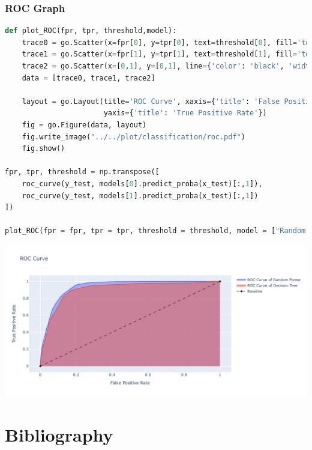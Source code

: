 \documentclass[11pt,a4paper]{article}
\begin{document}
    \subsubsection{ROC Graph}
\begin{lstlisting}[language = Python]
def plot_ROC(fpr, tpr, threshold,model):
    trace0 = go.Scatter(x=fpr[0], y=tpr[0], text=threshold[0], fill='tozeroy', name='ROC Curve of {} '.format(model[0]))
    trace1 = go.Scatter(x=fpr[1], y=tpr[1], text=threshold[1], fill='tozeroy', name='ROC Curve of {} '.format(model[1]))
    trace2 = go.Scatter(x=[0,1], y=[0,1], line={'color': 'black', 'width': 1, 'dash': 'dash'}, name='Baseline')
    data = [trace0, trace1, trace2]
    
    layout = go.Layout(title='ROC Curve', xaxis={'title': 'False Positive Rate'}, 
                       yaxis={'title': 'True Positive Rate'})
    fig = go.Figure(data, layout)
    fig.write_image("../../plot/classification/roc.pdf")
    fig.show()

fpr, tpr, threshold = np.transpose([
    roc_curve(y_test, models[0].predict_proba(x_test)[:,1]), 
    roc_curve(y_test, models[1].predict_proba(x_test)[:,1])
])

plot_ROC(fpr = fpr, tpr = tpr, threshold = threshold, model = ["Random Forest", "Decision Tree"])
\end{lstlisting}
    \noindent
    \begin{center}
        \includegraphics[width = 0.8 \textwidth]{plot/classification/roc.pdf}
    \end{center}
    
    
    \newpage
    \section{Bibliography}
\end{document}
